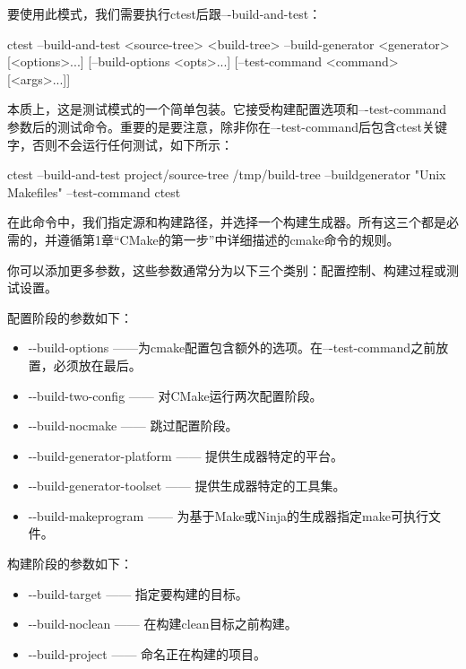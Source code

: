 
要使用此模式，我们需要执行ctest后跟–{}-build-and-test：

\begin{shell}
ctest --build-and-test <source-tree> <build-tree>
      --build-generator <generator> [<options>...]
      [--build-options <opts>...]
      [--test-command <command> [<args>...]]
\end{shell}

本质上，这是测试模式的一个简单包装。它接受构建配置选项和–{}-test-command参数后的测试命令。重要的是要注意，除非你在–{}-test-command后包含ctest关键字，否则不会运行任何测试，如下所示：

\begin{shell}
ctest --build-and-test project/source-tree /tmp/build-tree --buildgenerator "Unix Makefiles" --test-command ctest
\end{shell}

在此命令中，我们指定源和构建路径，并选择一个构建生成器。所有这三个都是必需的，并遵循第1章“CMake的第一步”中详细描述的cmake命令的规则。

你可以添加更多参数，这些参数通常分为以下三个类别：配置控制、构建过程或测试设置。

配置阶段的参数如下：

\begin{itemize}
\item
-{}-build-options ——为cmake配置包含额外的选项。在–{}-test-command之前放置，必须放在最后。

\item
-{}-build-two-config —— 对CMake运行两次配置阶段。

\item
-{}-build-nocmake —— 跳过配置阶段。

\item
-{}-build-generator-platform —— 提供生成器特定的平台。

\item
-{}-build-generator-toolset —— 提供生成器特定的工具集。

\item
-{}-build-makeprogram —— 为基于Make或Ninja的生成器指定make可执行文件。
\end{itemize}

构建阶段的参数如下：

\begin{itemize}
\item
-{}-build-target —— 指定要构建的目标。

\item
-{}-build-noclean —— 在构建clean目标之前构建。

\item
-{}-build-project —— 命名正在构建的项目。
\end{itemize}

